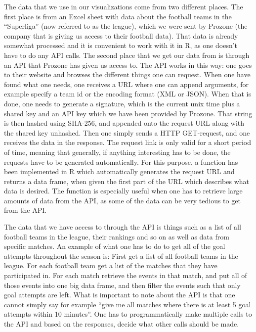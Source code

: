 \documentclass[Report.tex]{subfiles}
\begin{document}
The data that we use in our visualizations come from two different places. The first place is from an Excel sheet with data about the football teams in the ``Superliga'' (now referred to as the league), which we were sent by Prozone (the company that is giving us access to their football data). That data is already somewhat processed and it is convenient to work with it in R, as one doesn't have to do any API calls. The second place that we get our data from is through an API that Prozone has given us access to. The API works in this way: one goes to their website and browses the different things one can request. When one have found what one needs, one receives a URL where one can append arguments, for example specify a team id or the encoding format (XML or JSON). When that is done, one needs to generate a signature, which is the current unix time plus a shared key and an API key which we have been provided by Prozone. That string is then hashed using SHA-256, and appended onto the request URL along with the shared key unhashed. Then one simply sends a HTTP GET-request, and one receives the data in the response. The request link is only valid for a short period of time, meaning that generally, if anything interesting has to be done, the requests have to be generated automatically. For this purpose, a function has been implemented in R which automatically generates the request URL and returns a data frame, when given the first part of the URL which describes what data is desired. The function is especially useful when one has to retrieve large amounts of data from the API, as some of the data can be very tedious to get from the API. 

The data that we have access to through the API is things such as a list of all football teams in the league, their rankings and so on as well as data from specific matches. An example of what one has to do to get all of the goal attempts throughout the season is: First get a list of all football teams in the league. For each football team get a list of the matches that they have participated in. For each match retrieve the events in that match, and put all of those events into one big data frame, and then filter the events such that only goal attempts are left. What is important to note about the API is that one cannot simply say for example ``give me all matches where there is at least 5 goal attempts within 10 minutes''. One has to programmatically make multiple calls to the API and based on the responses, decide what other calls should be made.
\end{document}

